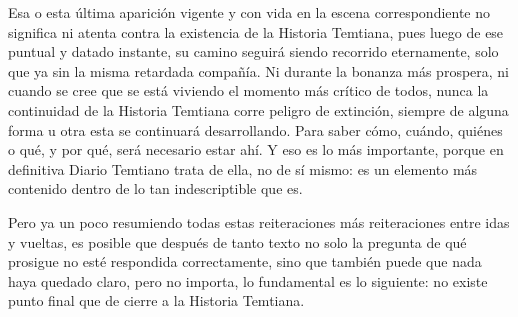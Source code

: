 \documentclass[
  spanish,
]{book}
\begin{document}
Esa o esta última aparición vigente y con vida en la escena correspondiente no significa ni atenta contra la existencia de la Historia Temtiana, pues luego de ese puntual y datado instante, su camino seguirá siendo recorrido eternamente, solo que ya sin la misma retardada compañía. Ni durante la bonanza más prospera, ni cuando se cree que se está viviendo el momento más crítico de todos, nunca la continuidad de la Historia Temtiana corre peligro de extinción, siempre de alguna forma u otra esta se continuará desarrollando. Para saber cómo, cuándo, quiénes o qué, y por qué, será necesario estar ahí. Y eso es lo más importante, porque en definitiva Diario Temtiano trata de ella, no de sí mismo: es un elemento más contenido dentro de lo tan indescriptible que es.

Pero ya un poco resumiendo todas estas reiteraciones más reiteraciones entre idas y vueltas, es posible que después de tanto texto no solo la pregunta de qué prosigue no esté respondida correctamente, sino que también puede que nada haya quedado claro, pero no importa, lo fundamental es lo siguiente: no existe punto final que de cierre a la Historia Temtiana.
\end{document}
